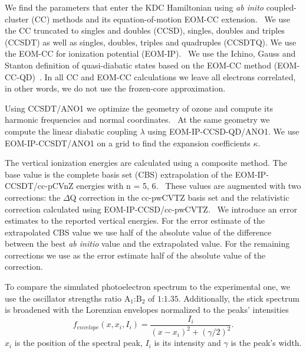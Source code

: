 \documentclass[12pt,pra,aps,superscriptaddress]{revtex4-2}
\begin{document}
We find the parameters that enter the KDC Hamiltonian using \emph{ab inito}
coupled-cluster (CC) methods and its equation-of-motion EOM-CC
extension.~\cite{Bartlett:CC_review:07, Krylov:EOMRev:07, Bartlett:Book:09,
Christiansen:EOMRev:11, Bartlet:EOMRev:12, Krylov:OSRev} We use the CC
truncated to singles and doubles (CCSD), singles, doubles and triples (CCSDT)
as well as singles, doubles, triples and quadruples
(CCSDTQ).\cite{Matthews:ncc:2015}  We use the EOM-CC for ionization potential
(EOM-IP).~\cite{StantonGauss:EOMIP:99} We use the Ichino, Gauss and Stanton
definition of quasi-diabatic states based on the EOM-CC method
(EOM-CC-QD)~\cite{Stanton:EOMIPdeg:09}. In all CC and EOM-CC calculations we
leave all electrons correlated, in other words, we do not use the
frozen-core approximation.

Using CCSDT/ANO1 we optimize the geometry of ozone and compute its harmonic
frequencies and normal coordinates.~\cite{Almlof:ANO,Almlof:ANO:1988} At the
same geometry we compute the linear diabatic coupling $\lambda$ using
EOM-IP-CCSD-QD/ANO1.  We use EOM-IP-CCSDT/ANO1 on a grid to find the
expansion coefficients $\kappa$.

The vertical ionization energies are calculated using a composite method. The
base value is the complete basis set (CBS) extrapolation of the
EOM-IP-CCSDT/cc-pCVnZ energies with n = 5, 6.~\cite{Woon:95:CCBS} These values
are augmented with two corrections: the $\Delta$Q correction in the cc-pwCVTZ
basis set and the relativistic correction calculated using
EOM-IP-CCSD/cc-pwCVTZ.~\cite{Dunning:02:p(w)CVnZ} We introduce an error
estimates to the reported vertical energies. For the error estimate of the
extrapolated CBS value we use half of the absolute value of the difference
between the best \emph{ab initio} value and the extrapolated value. For the
remaining corrections we use as the error estimate half of the absolute value
of the correction.

To compare the simulated photoelectron spectrum to the experimental one, we
use the oscillator strengths ratio A$_1$:B$_2$ of $1$:$1.35$.\cite{KDC:O3:92}
Additionally, the stick spectrum is broadened with the Lorenzian envelopes
normalized to the peaks' intensities
\begin{equation}
    f _{envelope}(x, x _i, I _i) = 
    \frac{I_i}{(x-x _i)^2 + (\gamma/ 2) ^2}.
    \label{eq:lorentzian}
\end{equation}
$x _i$ is the position of the spectral peak, $I _i$ is its intensity and
$\gamma$ is the peak's width.
\end{document}

